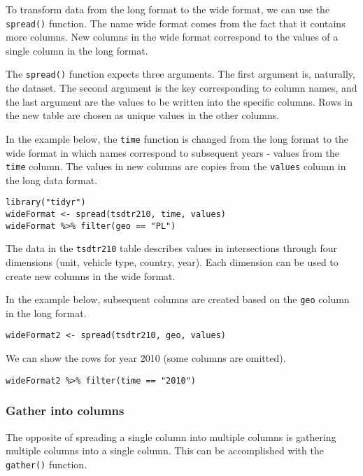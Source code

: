 \documentclass[]{book}
\theoremstyle{definition}
\theoremstyle{definition}
\theoremstyle{definition}
\theoremstyle{remark}
\begin{document}
To transform data from the long format to the wide format, we can use
the \texttt{spread()} function. The name wide format comes from the fact
that it contains more columns. New columns in the wide format correspond
to the values of a single column in the long format.

The \texttt{spread()} function expects three arguments. The first
argument is, naturally, the dataset. The second argument is the key
corresponding to column names, and the last argument are the values to
be written into the specific columns. Rows in the new table are chosen
as unique values in the other columns.

In the example below, the \texttt{time} function is changed from the
long format to the wide format in which names correspond to subsequent
years - values from the \texttt{time} column. The values in new columns
are copies from the \texttt{values} column in the long data format.

\begin{verbatim}
library("tidyr")
wideFormat <- spread(tsdtr210, time, values)
wideFormat %>% filter(geo == "PL")
\end{verbatim}

The data in the \texttt{tsdtr210} table describes values in
intersections through four dimensions (unit, vehicle type, country,
year). Each dimension can be used to create new columns in the wide
format.

In the example below, subsequent columns are created based on the
\texttt{geo} column in the long format.

\begin{verbatim}
wideFormat2 <- spread(tsdtr210, geo, values)
\end{verbatim}

We can show the rows for year 2010 (some columns are omitted).

\begin{verbatim}
wideFormat2 %>% filter(time == "2010")
\end{verbatim}

\subsubsection*{Gather into columns}\label{gather-into-columns}

The opposite of spreading a single column into multiple columns is
gathering multiple columns into a single column. This can be
accomplished with the \texttt{gather()} function.
\end{document}
